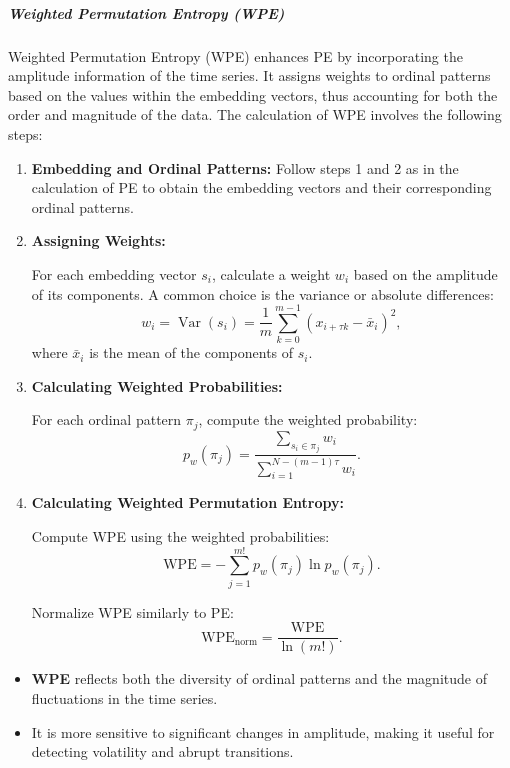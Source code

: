 \subparagraph{Weighted Permutation Entropy (WPE)}
Weighted Permutation Entropy (WPE) enhances PE by incorporating the amplitude information of the time series. It assigns weights to ordinal patterns based on the values within the embedding vectors, thus accounting for both the order and magnitude of the data.
The calculation of WPE involves the following steps:

\begin{enumerate} \item \textbf{Embedding and Ordinal Patterns:}
Follow steps 1 and 2 as in the calculation of PE to obtain the embedding vectors and their corresponding ordinal patterns.

\item \textbf{Assigning Weights:}

For each embedding vector $s_i$, calculate a weight $w_i$ based on the amplitude of its components. A common choice is the variance or absolute differences:
\begin{equation}
    w_i = \operatorname{Var}(s_i) = \frac{1}{m} \sum_{k=0}^{m-1} \left( x_{i+\tau k} - \bar{x}_i \right)^2,
\end{equation}
where $\bar{x}_i$ is the mean of the components of $s_i$.

\item \textbf{Calculating Weighted Probabilities:}

For each ordinal pattern $\pi_j$, compute the weighted probability:
\begin{equation}
    p_w(\pi_j) = \frac{\sum_{s_i \in \pi_j} w_i}{\sum_{i=1}^{N - (m -1)\tau} w_i}.
\end{equation}

\item \textbf{Calculating Weighted Permutation Entropy:}

Compute WPE using the weighted probabilities:
\begin{equation}
    \mathrm{WPE} = - \sum_{j=1}^{m!} p_w(\pi_j) \ln p_w(\pi_j).
\end{equation}

Normalize WPE similarly to PE:
\begin{equation}
    \mathrm{WPE}_{\text{norm}} = \frac{\mathrm{WPE}}{\ln(m!)}.
\end{equation}
\end{enumerate}
\begin{itemize} \item \textbf{WPE} reflects both the diversity of ordinal patterns and the magnitude of fluctuations in the time series. \item It is more sensitive to significant changes in amplitude, making it useful for detecting volatility and abrupt transitions. \end{itemize}

